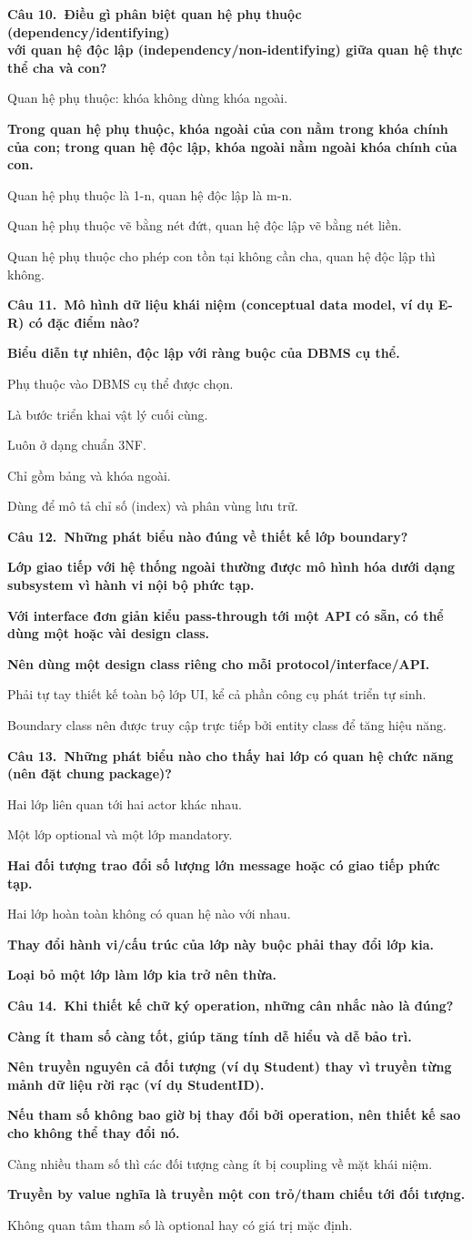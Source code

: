 \documentclass[11pt,a4paper]{article}
\newcommand{\cau}[2]{\par\vspace{2pt}\noindent\textbf{Câu #1.\ #2}\par\vspace{1pt}}
\newenvironment{pa}{\begin{list}{}{\leftmargin=0.95cm\labelwidth=0.5cm\labelsep=0.3cm\itemsep=1pt\parsep=0pt\topsep=0pt\partopsep=0pt}}{\end{list}}
\newcommand{\A}{\item[A.]}
\newcommand{\B}{\item[B.]}
\newcommand{\C}{\item[C.]}
\newcommand{\D}{\item[D.]}
\newcommand{\E}{\item[E.]}
\newcommand{\F}{\item[F.]}
\begin{document}
\cau{10}{Điều gì phân biệt quan hệ phụ thuộc (dependency/identifying)\\ với quan hệ độc lập (independency/non-identifying) giữa quan hệ thực thể cha và con?}
\begin{pa}
\A Quan hệ phụ thuộc: khóa không dùng khóa ngoài.
\B {\bfseries Trong quan hệ phụ thuộc, khóa ngoài của con nằm trong khóa chính của con; trong quan hệ độc lập, khóa ngoài nằm ngoài khóa chính của con.}
\C Quan hệ phụ thuộc là 1-n, quan hệ độc lập là m-n.
\D Quan hệ phụ thuộc vẽ bằng nét đứt, quan hệ độc lập vẽ bằng nét liền.
\E Quan hệ phụ thuộc cho phép con tồn tại không cần cha, quan hệ độc lập thì không.
\end{pa}

\cau{11}{Mô hình dữ liệu khái niệm (conceptual data model, ví dụ E-R) có đặc điểm nào?}
\begin{pa}
\A {\bfseries Biểu diễn tự nhiên, độc lập với ràng buộc của DBMS cụ thể.}
\B Phụ thuộc vào DBMS cụ thể được chọn.
\C Là bước triển khai vật lý cuối cùng.
\D Luôn ở dạng chuẩn 3NF.
\E Chỉ gồm bảng và khóa ngoài.
\F Dùng để mô tả chỉ số (index) và phân vùng lưu trữ.
\end{pa}

\cau{12}{Những phát biểu nào đúng về thiết kế lớp boundary?}
\begin{pa}
\A {\bfseries Lớp giao tiếp với hệ thống ngoài thường được mô hình hóa dưới dạng subsystem vì hành vi nội bộ phức tạp.}
\B {\bfseries Với interface đơn giản kiểu pass-through tới một API có sẵn, có thể dùng một hoặc vài design class.}
\C {\bfseries Nên dùng một design class riêng cho mỗi protocol/interface/API.}
\D Phải tự tay thiết kế toàn bộ lớp UI, kể cả phần công cụ phát triển tự sinh.
\E Boundary class nên được truy cập trực tiếp bởi entity class để tăng hiệu năng.
\end{pa}

\cau{13}{Những phát biểu nào cho thấy hai lớp có quan hệ chức năng (nên đặt chung package)?}
\begin{pa}
\A Hai lớp liên quan tới hai actor khác nhau.
\B Một lớp optional và một lớp mandatory.
\C {\bfseries Hai đối tượng trao đổi số lượng lớn message hoặc có giao tiếp phức tạp.}
\D Hai lớp hoàn toàn không có quan hệ nào với nhau.
\E {\bfseries Thay đổi hành vi/cấu trúc của lớp này buộc phải thay đổi lớp kia.}
\F {\bfseries Loại bỏ một lớp làm lớp kia trở nên thừa.}
\end{pa}

\cau{14}{Khi thiết kế chữ ký operation, những cân nhắc nào là đúng?}
\begin{pa}
\A {\bfseries Càng ít tham số càng tốt, giúp tăng tính dễ hiểu và dễ bảo trì.}
  \B {\bfseries Nên truyền nguyên cả đối tượng (ví dụ Student) thay vì truyền từng mảnh dữ liệu rời rạc (ví dụ StudentID).}
  \C {\bfseries Nếu tham số không bao giờ bị thay đổi bởi operation, nên thiết kế sao cho không thể thay đổi nó.}
  \D Càng nhiều tham số thì các đối tượng càng ít bị coupling về mặt khái niệm.
  \E {\bfseries Truyền by value nghĩa là truyền một con trỏ/tham chiếu tới đối tượng.}
\F Không quan tâm tham số là optional hay có giá trị mặc định.
\end{pa}
\end{document}
